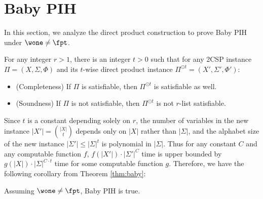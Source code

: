 \section{Baby PIH}
\label{sec:baby}
\noindent In this section, we analyze the direct product construction to prove Baby PIH under $\wone \neq \fpt$.
\begin{theorem}[Main]\label{thm:baby}
    For any integer $r>1$, there is an integer $t>0$ such that for any 2CSP instance $\Pi=(X,\Sigma,\Phi)$ and its $t$-wise direct product instance $\Pi^{\odot t}=(X',\Sigma',\Phi')$:
    \begin{itemize}
        \item (Completeness) If $\Pi$ is satisfiable, then $\Pi^{\odot t}$ is satisfiable as well.
        \item (Soundness) If $\Pi$ is not satisfiable, then $\Pi^{\odot t}$ is not $r$-list satisfiable.
    \end{itemize}
\end{theorem}

Since $t$ is a constant depending solely on $r$, the number of variables in the new instance $|X'|=\binom{|X|}{t}$ depends only on $|X|$ rather than $|\Sigma|$, and the alphabet size of the new instance $|\Sigma'|\le |\Sigma|^t$ is polynomial in $|\Sigma|$. Thus for any constant $C$ and any computable function $f$, $f(|X'|)\cdot |\Sigma'|^{C}$ time is upper bounded by $g(|X|)\cdot |\Sigma|^{C\cdot t}$ time for some computable function $g$. Therefore, we have the following corollary from Theorem \ref{thm:baby}:
\begin{corollary}
    Assuming $\wone\neq\fpt$, Baby PIH is true.
\end{corollary}


